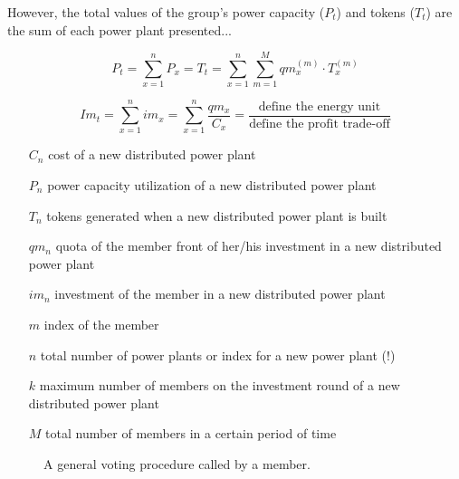 However, the total values of the group's power capacity ($P_{t}$) and tokens ($T_{t}$) are the sum of each power plant presented...

\begin{equation}
    P_{t} = \sum_{x=1}^{n} P_{x} = T_{t} = \sum_{x=1}^{n} \sum_{m=1}^{M} qm_{x}^{(m)} \cdot T_{x}^{(m)}
\end{equation}

\begin{equation}
    Im_{t} = \sum_{x=1}^{n} im_{x} = \sum_{x=1}^{n} \frac{qm_{x}}{C_{x}} = \frac{\text{define the energy unit}}{\text{define the profit trade-off}}
\end{equation}

\begin{itemize}
    \item[$C_{n}$] cost of a new distributed power plant
    \item[$P_{n}$] power capacity utilization of a new distributed power plant
    \item[$T_{n}$] tokens generated when a new distributed power plant is built
    \item[$qm_{n}$] quota of the member front of her/his investment in a new distributed power plant
    \item[$im_{n}$] investment of the member in a new distributed power plant
    \item[$m$] index of the member
    \item[$n$] total number of power plants or index for a new power plant (!)
    \item[$k$] maximum number of members on the investment round of a new distributed power plant
    \item[$M$] total number of members in a certain period of time
\end{itemize}

\begin{figure}[h!tbp]{\textwidth}
    \centering
    \caption{A general voting procedure called by a member.}
    \frame{\resizebox{\textwidth}{!}{}}
    \source{\copyright}
\end{figure}

\hline

